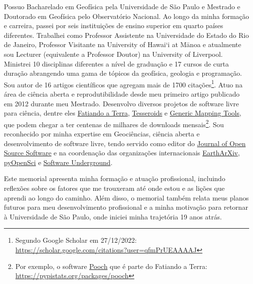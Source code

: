\documentclass[10pt,a4paper,oneside]{book}
\newcommand{\UHM}{University of Hawai`i at M\={a}noa}
\newcommand{\UERJ}{Universidade do Estado do Rio de Janeiro}
\begin{document}
Possuo Bacharelado em Geofísica pela Universidade de São Paulo e Mestrado
e Doutorado em Geofísica pelo Observatório Nacional.
Ao longo da minha formação e carreira, passei por seis instituições de ensino
superior em quarto países diferentes.
Trabalhei como Professor Assistente na \UERJ{},
Professor Visitante na \UHM{} e atualmente sou Lecturer (equivalente a
Professor Doutor) na University of Liverpool.
Ministrei 10 disciplinas diferentes a nível de graduação e 17 cursos de curta
duração abrangendo uma gama de tópicos da geofísica, geologia e programação.
Sou autor de 16 artigos científicos que agregam mais de 1700
citações\footnote{Segundo Google Scholar em 27/12/2022: \url{https://scholar.google.com/citations?user=qfmPrUEAAAAJ}}.
Atuo na área de ciência aberta e reprodutibilidade desde meu primeiro artigo
publicado em 2012 durante meu Mestrado.
Desenvolvo diversos projetos de software livre para ciência, dentre eles
\href{https://www.fatiando.org/}{Fatiando a Terra},
\href{https://tesseroids.leouieda.com}{Tesseroids}
e
\href{https://www.generic-mapping-tools.org/}{Generic Mapping Tools},
que podem chegar a ter centenas de milhares de downloads
mensais\footnote{Por exemplo, o software
\href{https://github.com/fatiando/pooch}{Pooch} que é parte do Fatiando a
Terra: \url{https://pypistats.org/packages/pooch}}.
Sou reconhecido por minha expertise em Geociências, ciência aberta e
desenvolvimento de software livre, tendo servido como editor do
\href{https://joss.theoj.org/}{Journal of Open Source Software} e na
coordenação das organizações internacionais
\href{https://eartharxiv.org/}{EarthArXiv},
\href{https://www.pyopensci.org/}{pyOpenSci}
e \href{https://softwareunderground.org}{Software Underground}.

Este memorial apresenta minha formação e atuação profissional, incluindo
reflexões sobre os fatores que me trouxeram até onde estou e as lições que
aprendi ao longo do caminho.
Além disso, o memorial também relata meus planos futuros para meu
desenvolvimento profissional e a minha motivação para retornar à Universidade
de São Paulo, onde iniciei minha trajetória 19 anos atrás.
\end{document}
